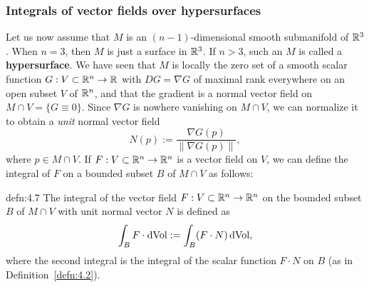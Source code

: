 \subsubsection{Integrals of vector fields over hypersurfaces} \label{subsubsec:4.2.2}
Let us now assume that $M$ is an $(n-1)$-dimensional smooth submanifold of $\mathbb{R}^3$. 
When $n = 3$, then $M$ is just a surface in $\mathbb{R}^3$. If $n > 3$, such an $M$ 
is called a {\bf hypersurface}. We have seen that $M$ is locally the zero 
set of a smooth scalar function $G : V \subset \mathbb{R}^n \to \mathbb{R}$ with $DG = 
\nabla G$ of maximal rank everywhere on an open subset $V$ of $\mathbb{R}^n$, and 
that the gradient is a normal vector field on $M \cap V = \{G \equiv 0\}$. 
Since $\nabla G$ is nowhere vanishing on $M \cap V$, we can normalize it to 
obtain a \emph{unit} normal vector field 
\[ N(p) := \frac{\nabla G(p)}{\|\nabla G(p)\|}, \] 
where $p \in M \cap V$. If $F : V \subset \mathbb{R}^n \to \mathbb{R}^n$ is a vector field on $V$, 
we can define the integral of $F$ on a bounded subset $B$ of $M \cap V$ as follows: 

\begin{defn}{defn:4.7}
    The integral of the vector field $F : V \subset \mathbb{R}^n \to \mathbb{R}^n$ on the 
    bounded subset $B$ of $M \cap V$ with unit normal vector $N$ is defined as 
    \[ \int_B F \cdot \operatorname{dVol} := \int_B (F \cdot N) \operatorname{dVol}, \] 
    where the second integral is the integral of the scalar function 
    $F \cdot N$ on $B$ (as in Definition~\ref{defn:4.2}).
\end{defn}\vspace{-0.25cm}

